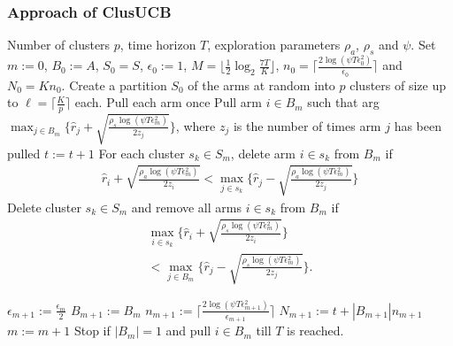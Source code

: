 \begin{frame}[allowframebreaks]
\frametitle{Approach of ClusUCB}

\begin{algorithmic}
 Number of clusters $p$, time horizon $T$, exploration parameters $\rho_a$, $\rho_s$ and $\psi$.
 Set $m:=0$, $B_{0}:=A$, $S_0 = S$, $\epsilon_{0}:=1$, $M=\big \lfloor \frac{1}{2}\log_{2} \frac{7T}{K}\big\rfloor$, $n_{0}=\bigg\lceil\frac{2\log{(\psi T\epsilon_{0}^{2})}}{\epsilon_{0}}\bigg\rceil$ and  $N_{0}=Kn_{0}$.
\State Create a partition $S_0$ of the arms at random into $p$ clusters of size up to $\ell=\bigg\lceil \frac{K}{p} \bigg\rceil$ each.
\State Pull each arm once
\State Pull arm $i\in B_m$ such that arg$\max_{j\in B_{m}}\bigg\lbrace \hat{r}_{j} + \sqrt{\frac{\rho_{s}\log{(\psi T\epsilon_{m}^{2})}}{2 z_{j}}} \bigg\rbrace$, where $z_j$ is the number of times arm $j$ has been pulled
\State $t:=t+1$
\ArmElim
\State For each cluster $s_k \in S_{m}$, delete arm ${i}\in s_{k}$ from $B_{m}$ if
\begin{align*}
\hat{r}_{i} + \sqrt{\frac{\rho_{a}\log{(\psi T\epsilon_{m}^{2})}}{2 z_{i}}}  < \max_{{j}\in s_{k}}\bigg\lbrace\hat{r}_{j} -\sqrt{\frac{\rho_{a}\log{(\psi T\epsilon_{m}^{2})}}{2 z_{j}}} \bigg\rbrace
\end{align*}
\EndArmElim
\ClusElim
\State Delete cluster $s_{k}\in S_{m}$ and remove all arms $i\in s_{k}$ from $B_{m}$ if 
\begin{align*}
 \max_{{i}\in s_{k}}\bigg\lbrace\hat{r}_{i} + \sqrt{\frac{\rho_{s}\log{(\psi T\epsilon_{m}^{2})}}{2 z_{i}}}\bigg\rbrace \\
 < \max_{{j}\in B_{m}} \bigg\lbrace\hat{r}_{j} - \sqrt{\frac{\rho_{s} \log{(\psi T\epsilon_{m}^{2})}}{2 z_{j}}}\bigg\rbrace.
\end{align*}
\EndClusElim

\State $\epsilon_{m+1}:=\frac{\epsilon_{m}}{2}$\vspace{0.5ex}
\State $B_{m+1}:=B_{m}$
\State $n_{m+1}:=\bigg\lceil\frac{2\log{(\psi T\epsilon_{m+1}^{2})}}{\epsilon_{m+1}}\bigg\rceil$
\State $N_{m+1}:=t+|B_{m+1}| n_{m+1}$
\State $m:=m+1$
\State Stop if $|B_{m}|=1$ and pull ${i}\in B_{m}$ till $T$ is reached.
\EndIf
\EndFor
\end{algorithmic}

\end{frame}

